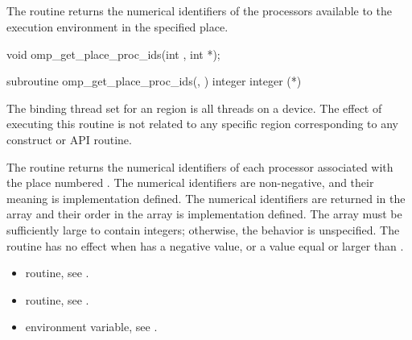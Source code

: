 \subsection{}
\label{subsec:omp_get_place_proc_ids}

\summary
The  routine returns the numerical 
identifiers of the processors available to the execution environment 
in the specified place.

\format
\begin{ccppspecific}
\begin{ompcFunction}
void omp_get_place_proc_ids(int , int *);
\end{ompcFunction}
\end{ccppspecific}

\begin{fortranspecific}
\begin{ompfSubroutine}
subroutine omp_get_place_proc_ids(, )
integer 
integer (*)
\end{ompfSubroutine}
\end{fortranspecific}

\binding
The binding thread set for an  region is all
threads on a device. The effect of executing this routine is not related to
any specific region corresponding to any construct or API routine.

\effect
The  routine returns the numerical
identifiers of each processor associated with the place numbered
. The numerical identifiers are non-negative, and
their meaning is implementation defined.  The numerical identifiers
are returned in the array  and their order in the array is
implementation defined. The array must be sufficiently large to contain
\code{)} integers;
otherwise, the behavior is unspecified.  The routine has no effect when
 has a negative value, or a value equal or larger
than .

\crossreferences
\begin{itemize}
\item {} routine, see
.

\item {} routine, see
.

\item {} environment variable, see
.
\end{itemize}



